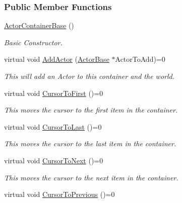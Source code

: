 \subsubsection*{Public Member Functions}
\begin{DoxyCompactItemize}
\item 
\hyperlink{classMezzanine_1_1ActorContainerBase_a1cde28138d1b72713b87c9b1a4cbe9d1}{ActorContainerBase} ()
\begin{DoxyCompactList}\small\item\em Basic Constructor. \item\end{DoxyCompactList}\item 
virtual void \hyperlink{classMezzanine_1_1ActorContainerBase_aba981ad61ed549531a22d520ba2a231c}{AddActor} (\hyperlink{classMezzanine_1_1ActorBase}{ActorBase} $\ast$ActorToAdd)=0
\begin{DoxyCompactList}\small\item\em This will add an Actor to this container and the world. \item\end{DoxyCompactList}\item 
virtual void \hyperlink{classMezzanine_1_1ActorContainerBase_a7e26df0af80a28be01d0aaef7d350a65}{CursorToFirst} ()=0
\begin{DoxyCompactList}\small\item\em This moves the cursor to the first item in the container. \item\end{DoxyCompactList}\item 
virtual void \hyperlink{classMezzanine_1_1ActorContainerBase_a3f90f7b919bb821389f1493c6c121cce}{CursorToLast} ()=0
\begin{DoxyCompactList}\small\item\em This moves the cursor to the last item in the container. \item\end{DoxyCompactList}\item 
virtual void \hyperlink{classMezzanine_1_1ActorContainerBase_a906736a79fc92f45ae0cb73cfa2e7ed3}{CursorToNext} ()=0
\begin{DoxyCompactList}\small\item\em This moves the cursor to the next item in the container. \item\end{DoxyCompactList}\item 
virtual void \hyperlink{classMezzanine_1_1ActorContainerBase_a43c40059dc0c99742e99efa68c1acf52}{CursorToPrevious} ()=0

\end{DoxyCompactItemize}
